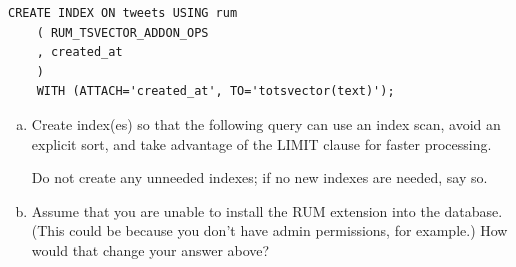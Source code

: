 \documentclass[12pt]{exam}
\theoremstyle{definition}
\begin{document}
\begin{questions}

\newpage




\newpage

\newpage
{}
\begin{solution}
\begin{lstlisting}
CREATE INDEX ON tweets USING rum 
    ( RUM_TSVECTOR_ADDON_OPS
    , created_at
    )
    WITH (ATTACH='created_at', TO='totsvector(text)');
\end{lstlisting}
\end{solution}

\begin{enumerate}[a)]
\item
Create index(es) so that the following query can use an index scan, avoid an explicit sort, and take advantage of the LIMIT clause for faster processing.

Do not create any unneeded indexes; if no new indexes are needed, say so.

\vspace{3.5in}
\item
Assume that you are unable to install the RUM extension into the database.
(This could be because you don't have admin permissions, for example.)
How would that change your answer above?
\end{enumerate}


\end{questions}
\end{document}
